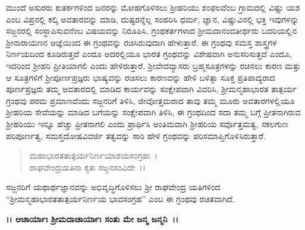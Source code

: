 ಮುಂದೆ ಅಸುರರು ಕುತರ್ಕಗಳಿಂದ ಜನರನ್ನು ಮೋಹಗೊಳಿಸಲು ಶ‍್ರೀಹರಿಯು ಶಂಫಲವೆಂಬ ಗ್ರಾಮದಲ್ಲಿ ವಿಷ್ಣು ಯಶ ಎಂಬ ವಿಪ್ರನಲ್ಲಿ ಕಲ್ಕಿ ಅವತಾರವನ್ನು ಮಾಡಿ, ದುಷ್ಟರನ್ನೆಲ್ಲ ಸಂಹರಿಸಿ ಧರ್ಮ, ಜ್ಞಾನ, ವಿಷ್ಣುವಿನಲ್ಲಿ ಭಕ್ತಿ ಇವುಗಳನ್ನು ಸಜ್ಜನರಲ್ಲಿ ಸಂಸ್ಥಾಪಿ\-ಸುವನೆಂಬ ವಿಷಯವನ್ನು ನಿರೂಪಿಸಿ, ಗ್ರಂಥಕರ್ತಗಳಾದ ಶ‍್ರೀಮದಾನಂದತೀರ್ಥರು ಬದರಿಯಲ್ಲಿನ ಶ‍್ರೀನಾರಾಯಣನ ಆಜ್ಞೆಯಿಂದ ಈ ಗ್ರಂಥವನ್ನು ರಚಿಸಿರುವುದಾಗಿ ಹೇಳುತ್ತಾರೆ. ಈ ಗ್ರಂಥವು ಸಮಸ್ತ ಶಾಸ್ತ್ರಗಳ ನಿರ್ಣಯದಿಂದ ಕೂಡಿರುತ್ತದೆ ಎಂದೂ ಅದರಲ್ಲಿಯೂ ಭಾರತ ಗ್ರಂಥವನ್ನು ವಿಶೇಷವಾಗಿ ಅನುಸರಿಸುತ್ತದೆ ಎಂದೂ, ಇದರಿಂದ ಶ‍್ರೀಹರಿ ಪ್ರೀತಿಯಾಗಲಿ ಎಂದು ಹೇಳಿರುತ್ತಾರೆ. ಶ‍್ರೀವೇದವ್ಯಾಸರು ಬ್ರಹ್ಮಸೂತ್ರಗಳನ್ನು ರಚಿಸಲು ಕಾರಣ ಮತ್ತು ಆ ಸೂತ್ರಗಳಿಗೆ ಶ‍್ರೀಪೂರ್ಣಪ್ರಜ್ಞರು ಭಾಷ್ಯವನ್ನು ರಚಿಸಲು ಕಾರಣವನ್ನು ಹೇಳಿ ಬಳಿತ್ಸಾ ಸೂಕ್ತ ಪ್ರತಿಪಾದ್ಯರಾದ ಪೂರ್ಣಪ್ರಜ್ಞರು ತಮ್ಮ ಅವತಾರದಲ್ಲಿ ಮಾಡಿದ ಕಾರ್ಯವನ್ನು ಸಂಕ್ಷೇಪವಾಗಿ ವಿವರಿಸಿ, ಶ‍್ರೀಮನ್ಮಹಾಭಾರತ ತಾತ್ಪರ್ಯ ಗ್ರಂಥವು ಪರಮ ಪ್ರಮಾಣವೆಂದು ಸಜ್ಜನರಿಗೆ ತಿಳಿಸಿ, ಜೀವೋತ್ತಮರಾದ ತಾವು ತಮ್ಮ ಮೂರು ಅವತಾರಗಳಲ್ಲಿಯೂ ಶ‍್ರೀಹರಿಯ ಸೇವೆಯನ್ನು ಮಾಡಿದ ಬಗೆಯನ್ನು ಸಂಕ್ಷೇಪವಾಗಿ ತಿಳಿಸಿ, ಈ ಗ್ರಂಥದಿಂದ ಸದಾ ತಮ್ಮ ಬಗ್ಗೆ ಪ್ರೀತನಾಗಿರುವ ಶ‍್ರೀಹರಿಯು ಇನ್ನೂ ಹೆಚ್ಚು ಪ್ರೀತನಾಗಲಿ ಎಂದು ಪ್ರಾರ್ಥಿಸಿ ಅಂತಿಮವಾಗಿ ಶ‍್ರೀಹರಿಯ ಸರ್ವೊತ್ತಮತ್ವ, ಸಕಲಗುಣ ಪರಿಪೂರ್ಣತ್ವ, ಸಮಸ್ತದೋಷವಿವರ್ಜಿ ತತ್ವವನ್ನು ಸಾರಿ ಹೇಳಿ ಗ್ರಂಥವನ್ನು ಪರಿಸಮಾಪ್ತಿಗೊಳಿಸಿರುತ್ತಾರೆ.

\begin{verse}
ಮಹಾಭಾರತತಾತ್ಪರ್ಯನಿರ್ಣಯಾಶಯಸಂಗ್ರಹಃ~।\\ ರಾಘವೇಂದ್ರಯತಿನಾ ಕೃತಃ ಸಜ್ಜನಸಂವಿದೇ~।।
\end{verse}

ಸಜ್ಜನರಿಗೆ ಯಥಾರ್ಥಜ್ಞಾನವನ್ನು ಅಭಿವೃದ್ಧಿಗೊಳಿಸಲು ಶ‍್ರೀ ರಾಘವೇಂದ್ರ ಯತಿಗಳಿಂದ “ಶ‍್ರೀಮನ್ಮಹಾಭಾರತತಾತ್ಪರ್ಯನಿರ್ಣಯ ಭಾವಸಂಗ್ರಹ” ಎಂಬ ಈ ಗ್ರಂಥವು ರಚಿತವಾಗಿದೆ.

\begin{center}
\textbf{।। ಆಚಾರ್ಯಾಃ ಶ‍್ರೀಮದಾಚಾರ್ಯಾಃ ಸಂತು ಮೇ ಜನ್ಮ ಜನ್ಮನಿ~।।}
\end{center}


